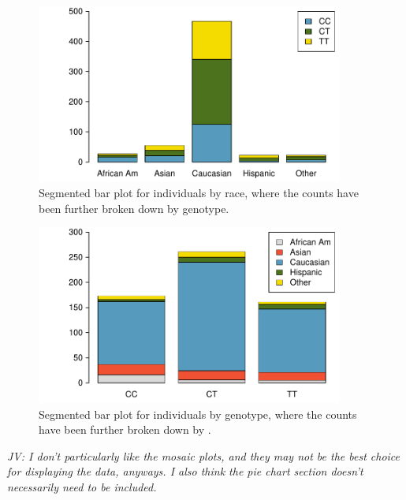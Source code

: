 \begin{doublespace}
\begin{figure}[h!]
\includegraphics[width=0.9\textwidth]{ch_intro_to_data_oi_biostat/figures/famussSegBar/famussSegBarTest} 
\caption{Segmented bar plot for individuals by race, where the counts have been further broken down by genotype.}
\label{famussSegBarTest}
\end{figure}

\begin{figure}[h!]
\includegraphics[width=0.9\textwidth]{ch_intro_to_data_oi_biostat/figures/famussSegBar/famussSegBarTestB}
\caption{Segmented bar plot for individuals by genotype, where the counts have been further broken down by .}
\label{famussSegBarTestB}
\end{figure}

\textit{JV: I don't particularly like the mosaic plots, and they may not be the best choice for displaying the  data, anyways. I also think the pie chart section doesn't necessarily need to be included.}

\end{doublespace}
